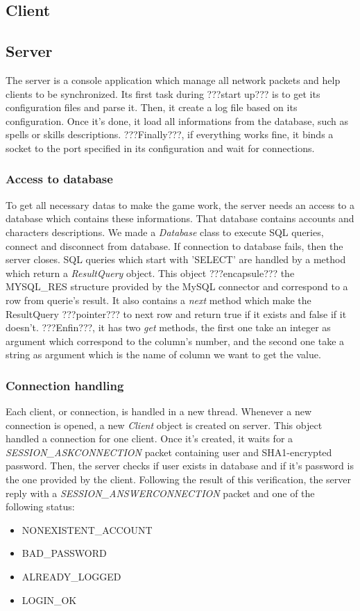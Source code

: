 \documentclass{scrreprt}
\begin{document}
			\subsection{Client}
			\subsection{Server}
			The server is a console application which manage all network packets and help clients to be synchronized. Its first task during ???start up??? is to  get its configuration files and parse it. Then, it create a log file based on its configuration. Once it's done, it load all informations from the database, such as spells or skills descriptions. ???Finally???, if everything works fine, it binds a socket to the port specified in its configuration and wait for connections.
			\subsubsection{Access to database}
			To get all necessary datas to make the game work, the server needs an access to a database which contains these informations. That database contains accounts and characters descriptions. We made a \emph{Database} class to execute SQL queries, connect and disconnect from database. If connection to database fails, then the server closes. SQL queries which start with 'SELECT' are handled by a method which return a \emph{ResultQuery} object. This object ???encapsule??? the MYSQL\_RES structure provided by the MySQL connector and correspond to a row from querie's result. It also contains a \emph{next} method which make the ResultQuery ???pointer??? to next row and return true if it exists and false if it doesn't. ???Enfin???, it has two \emph{get} methods, the first one take an integer as argument which correspond to the column's number, and the second one take a string as argument which is the name of column we want to get the value.
			\subsubsection{Connection handling}
			Each client, or connection, is handled in a new thread. Whenever a new connection is opened, a new \emph{Client} object is created on server. This object handled a connection for one client. Once it's created, it waits for a \emph{SESSION\_ASKCONNECTION} packet containing user and SHA1-encrypted password. Then, the server checks if user exists in database and if it's password is the one provided by the client. Following the result of this verification, the server reply with a \emph{SESSION\_ANSWERCONNECTION} packet and one of the following status:
			\begin{itemize}
			\item{NONEXISTENT\_ACCOUNT}
			\item{BAD\_PASSWORD}
			\item{ALREADY\_LOGGED}
			\item{LOGIN\_OK}
			\end{itemize}
\end{document}
